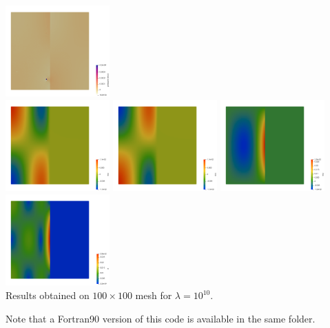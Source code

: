 \begin{center}
\includegraphics[width=4cm]{python_codes/fieldstone_05/results/press_error}\\
\includegraphics[width=4cm]{python_codes/fieldstone_05/results/exx}
\includegraphics[width=4cm]{python_codes/fieldstone_05/results/eyy}
\includegraphics[width=4cm]{python_codes/fieldstone_05/results/exy}
\includegraphics[width=4cm]{python_codes/fieldstone_05/results/sr}\\
{\captionfont Results obtained on $100 \times 100$ mesh for $\lambda=10^{10}$.}
\end{center}



\infortran
Note that a Fortran90 version of this code is available in the same folder. 


